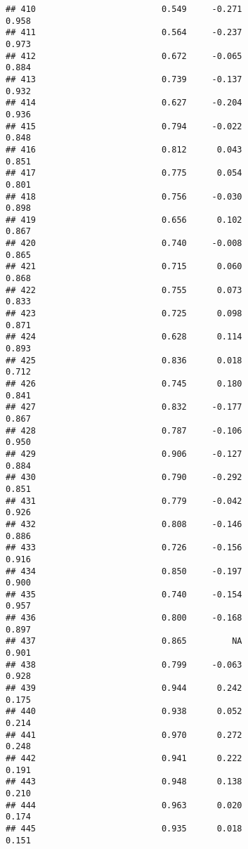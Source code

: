 \documentclass[
]{article}
\begin{document}
\begin{verbatim}
## 410                         0.549     -0.271                     0.958
## 411                         0.564     -0.237                     0.973
## 412                         0.672     -0.065                     0.884
## 413                         0.739     -0.137                     0.932
## 414                         0.627     -0.204                     0.936
## 415                         0.794     -0.022                     0.848
## 416                         0.812      0.043                     0.851
## 417                         0.775      0.054                     0.801
## 418                         0.756     -0.030                     0.898
## 419                         0.656      0.102                     0.867
## 420                         0.740     -0.008                     0.865
## 421                         0.715      0.060                     0.868
## 422                         0.755      0.073                     0.833
## 423                         0.725      0.098                     0.871
## 424                         0.628      0.114                     0.893
## 425                         0.836      0.018                     0.712
## 426                         0.745      0.180                     0.841
## 427                         0.832     -0.177                     0.867
## 428                         0.787     -0.106                     0.950
## 429                         0.906     -0.127                     0.884
## 430                         0.790     -0.292                     0.851
## 431                         0.779     -0.042                     0.926
## 432                         0.808     -0.146                     0.886
## 433                         0.726     -0.156                     0.916
## 434                         0.850     -0.197                     0.900
## 435                         0.740     -0.154                     0.957
## 436                         0.800     -0.168                     0.897
## 437                         0.865         NA                     0.901
## 438                         0.799     -0.063                     0.928
## 439                         0.944      0.242                     0.175
## 440                         0.938      0.052                     0.214
## 441                         0.970      0.272                     0.248
## 442                         0.941      0.222                     0.191
## 443                         0.948      0.138                     0.210
## 444                         0.963      0.020                     0.174
## 445                         0.935      0.018                     0.151

\end{verbatim}
\end{document}
